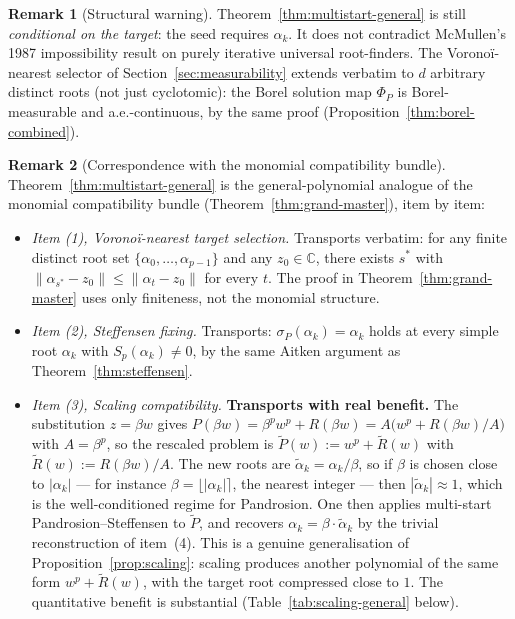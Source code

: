 \documentclass[11pt,a4paper]{article}
\theoremstyle{definition}
\newtheorem{remark}{Remark}[section]
\begin{document}
\begin{remark}[Structural warning]
Theorem~\ref{thm:multistart-general} is still \emph{conditional on the target}: the seed requires $\alpha_k$. It does not contradict McMullen's 1987 impossibility result on purely iterative universal root-finders. The Voronoï-nearest selector of Section~\ref{sec:measurability} extends verbatim to $d$ arbitrary distinct roots (not just cyclotomic): the Borel solution map $\Phi_P$ is Borel-measurable and a.e.-continuous, by the same proof (Proposition~\ref{thm:borel-combined}).
\end{remark}

\begin{remark}[Correspondence with the monomial compatibility bundle]\label{rem:grand-master-correspondence}
Theorem~\ref{thm:multistart-general} is the general-polynomial analogue of the monomial compatibility bundle (Theorem~\ref{thm:grand-master}), item by item:
\begin{itemize}
  \item \emph{Item (1), Voronoï-nearest target selection.} Transports verbatim: for any finite distinct root set $\{\alpha_0, \ldots, \alpha_{p-1}\}$ and any $z_0 \in \mathbb{C}$, there exists $s^\ast$ with $\|\alpha_{s^\ast} - z_0\| \leq \|\alpha_t - z_0\|$ for every $t$. The proof in Theorem~\ref{thm:grand-master} uses only finiteness, not the monomial structure.
  \item \emph{Item (2), Steffensen fixing.} Transports: $\sigma_P(\alpha_k) = \alpha_k$ holds at every simple root $\alpha_k$ with $S_p(\alpha_k) \neq 0$, by the same Aitken argument as Theorem~\ref{thm:steffensen}.
  \item \emph{Item (3), Scaling compatibility.} \textbf{Transports with real benefit.} The substitution $z = \beta w$ gives $P(\beta w) = \beta^p w^p + R(\beta w) = A\bigl(w^p + R(\beta w)/A\bigr)$ with $A = \beta^p$, so the rescaled problem is $\tilde P(w) := w^p + \tilde R(w)$ with $\tilde R(w) := R(\beta w)/A$. The new roots are $\tilde \alpha_k = \alpha_k/\beta$, so if $\beta$ is chosen close to $|\alpha_k|$ --- for instance $\beta = \lfloor|\alpha_k|\rceil$, the nearest integer --- then $|\tilde \alpha_k| \approx 1$, which is the well-conditioned regime for Pandrosion. One then applies multi-start Pandrosion--Steffensen to $\tilde P$, and recovers $\alpha_k = \beta \cdot \tilde \alpha_k$ by the trivial reconstruction of item~(4). This is a genuine generalisation of Proposition~\ref{prop:scaling}: scaling produces another polynomial of the same form $w^p + \tilde R(w)$, with the target root compressed close to $1$. The quantitative benefit is substantial (Table~\ref{tab:scaling-general} below).

\end{itemize}
\end{remark}
\end{document}
